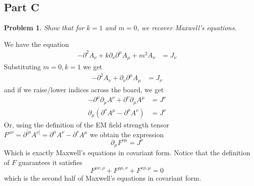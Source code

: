 \documentclass[fontsize=11pt]{scrartcl} %
\numberwithin{equation}{section} %
\numberwithin{figure}{section} %
\numberwithin{table}{section} %
\newtheorem*{problem}{Problem}
\begin{document}
\newpage
\subsection*{Part C}
\begin{problem}
    Show that for $k=1$ and $m=0$, we recover Maxwell's equations.
\end{problem}

We have the equation
\[
    \begin{aligned}
    -\partial^2 A_{\nu} + k\partial_{\nu}\partial^{\mu}A_{\mu} + m^2A_{\nu} &=
    J_{\nu}
    \end{aligned}
\]
Substituting $m=0,k=1$ we get
\[
    \begin{aligned}
    -\partial^2 A_{\nu} + \partial_{\nu}\partial^{\mu}A_{\mu} &=
    J_{\nu}
    \end{aligned}
\]
and if we raise/lower indices across the board, we get
\[
    \begin{aligned}
        -\partial^{\mu}\partial_{\mu}A^{\nu} +
        \partial^{\nu}\partial_{\mu}A^{\mu} &= J^{\nu}\\
        \partial_{\mu}\left( 
        \partial^{\nu}A^{\mu}-\partial^{\mu}A^{\nu}
    \right) &= J^{\nu}
    \end{aligned}
\]
Or, using the definition of the EM field strength tensor $F^{\mu\nu} =
\partial^{[\mu}A^{\nu]} = \partial^{\mu}A^{\nu} - \partial^{\nu}A^{\mu}$ we
obtain the expression
\[
    \partial_{\mu}F^{\nu\mu} = J^{\nu}
\]
Which is exactly Maxwell's equations in covariant form. Notice that the
definition of $F$ guarantees it satisfies
\[
    F^{\mu\nu,\rho} + F^{\rho\mu,\nu} + F^{\nu\rho,\mu} = 0
\]
which is the second half of Maxwell's equations in covariant form.
\end{document}

